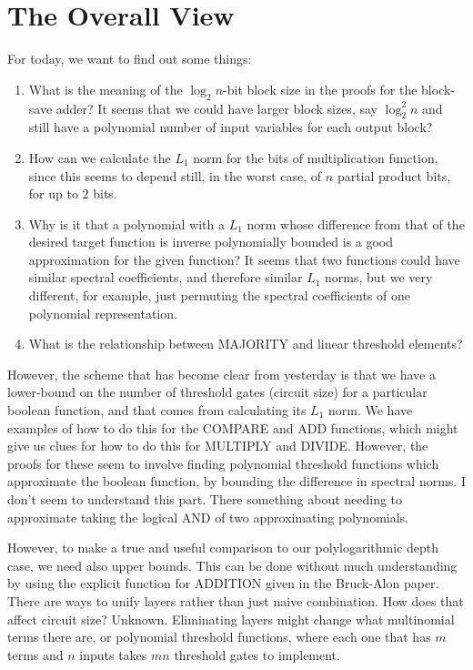 \documentclass{article}
\begin{document}
\section{The Overall View}

For today, we want to find out some things:

\begin{enumerate}
\item What is the meaning of the $\log_2 n$-bit block size in the proofs for
the block-save adder? It seems that we could have larger block sizes, say
$\log^2_2 n$ and still have a polynomial number of input variables for each
output block?

\item
How can we calculate the $L_1$ norm for the bits of multiplication 
function, since this seems to depend still, in the worst case, of
$n$ partial product bits, for up to $2$ bits.

\item
Why is it that a polynomial with a $L_1$ norm whose difference from that
of the desired target function is inverse polynomially
bounded is a good approximation for the given function? It seems that
two functions could have similar spectral coefficients, and therefore
similar $L_1$ norms, but we very different, for example, just
permuting the spectral coefficients of one polynomial representation.

\item
What is the relationship between MAJORITY and linear threshold elements?

\end{enumerate}

However, the scheme that has become clear from yesterday is that we have
a lower-bound on the number of threshold gates (circuit size) for a 
particular boolean function, and that comes from calculating its $L_1$
norm. We have examples of how to do this for the COMPARE and ADD functions,
which might give us clues for how to do this for MULTIPLY and DIVIDE.
However, the proofs for these seem to involve finding polynomial
threshold functions which approximate the boolean function, by bounding
the difference in spectral norms. I don't seem to understand this part.
There something about needing to approximate taking the logical AND
of two approximating polynomials.

However, to make a true and useful comparison to our polylogarithmic depth
case, we need also upper bounds. This can be done without much understanding
by using the explicit function for ADDITION given in the Bruck-Alon paper.
There are ways to unify layers rather than just naive combination.
How does that affect circuit size? Unknown. Eliminating layers might
change what multinomial terms there are, or polynomial threshold functions,
where each one that has $m$ terms and $n$ inputs takes $mn$ threshold gates
to implement.
\end{document}
